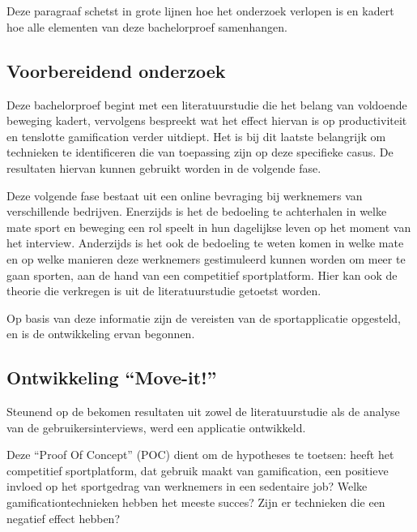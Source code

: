 
\chapter{}%
\label{ch:methodologie}

Deze paragraaf schetst in grote lijnen hoe het onderzoek verlopen is en kadert hoe alle elementen van deze bachelorproef samenhangen.

\section{Voorbereidend onderzoek}
Deze bachelorproef begint met een literatuurstudie die het belang van voldoende beweging kadert, vervolgens bespreekt wat het effect hiervan is op productiviteit en tenslotte gamification verder uitdiept. Het is bij dit laatste belangrijk om technieken te identificeren die van toepassing zijn op deze specifieke casus. De resultaten hiervan kunnen gebruikt worden in de volgende fase.

Deze volgende fase bestaat uit een online bevraging bij werknemers van verschillende bedrijven. Enerzijds is het de bedoeling te achterhalen in welke mate sport en beweging een rol speelt in hun dagelijkse leven op het moment van het interview. Anderzijds is het ook de bedoeling te weten komen in welke mate en op welke manieren deze werknemers gestimuleerd kunnen worden om meer te gaan sporten, aan de hand van een competitief sportplatform. Hier kan ook de theorie die verkregen is uit de literatuurstudie getoetst worden.

Op basis van deze informatie zijn de vereisten van de sportapplicatie opgesteld, en is de ontwikkeling ervan begonnen.

\section{Ontwikkeling ``Move-it!''}

Steunend op de bekomen resultaten uit zowel de literatuurstudie als de analyse van de gebruikersinterviews, werd een applicatie ontwikkeld.

Deze ``Proof Of Concept'' (POC) dient om de hypotheses te toetsen: heeft het competitief sportplatform, dat gebruik maakt van gamification, een positieve invloed op het sportgedrag van werknemers in een sedentaire job? Welke gamificationtechnieken hebben het meeste succes? Zijn er technieken die een negatief effect hebben?

